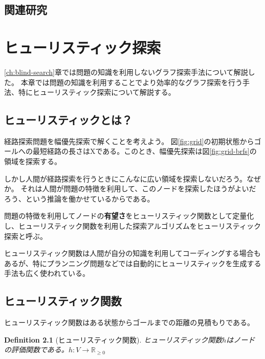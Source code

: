 \documentclass{book}
\newtheorem{definition}{Definition}
\begin{document}


\section{関連研究}



\chapter{ヒューリスティック探索}
\label{ch:heuristic-search}

\ref{ch:blind-search}章では問題の知識を利用しないグラフ探索手法について解説した。
本章では問題の知識を利用することでより効率的なグラフ探索を行う手法、特にヒューリスティック探索について解説する。

\section{ヒューリスティックとは？}
\label{sec:heursitic}

経路探索問題を幅優先探索で解くことを考えよう。
図\ref{fig:grid}の初期状態からゴールへの最短経路の長さはXである。このとき、幅優先探索は図\ref{fig:grid-brfs}の領域を探索する。

しかし人間が経路探索を行うときにこんなに広い領域を探索しないだろう。なぜか。
それは人間が問題の特徴を利用して、このノードを探索したほうがよいだろう、という推論を働かせているからである。

問題の特徴を利用してノードの{\bf 有望さ}をヒューリスティック関数として定量化し、ヒューリスティック関数を利用した探索アルゴリズムをヒューリスティック探索と呼ぶ。

ヒューリスティック関数は人間が自分の知識を利用してコーディングする場合もあるが、特にプランニング問題などでは自動的にヒューリスティックを生成する手法も広く使われている。


\section{ヒューリスティック関数}
\label{sec:heuristic-function}

ヒューリスティック関数はある状態からゴールまでの距離の見積もりである。

\begin{definition}[ヒューリスティック関数]
ヒューリスティック関数$h$はノードの評価関数である。$h: V \rightarrow \mathbb{R}_{\geq 0}$
\end{definition}
\end{document}
